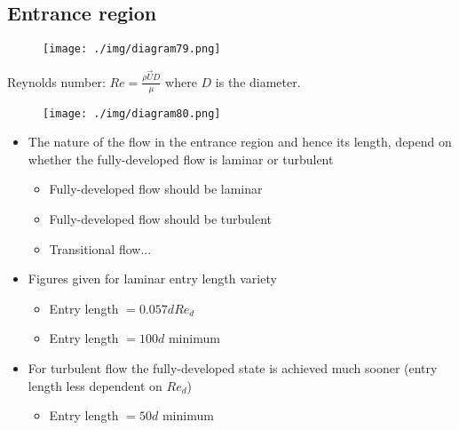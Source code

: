 \subsection{Entrance region}
\begin{figure}[H]
  \centering
  \texttt{[image: ./img/diagram79.png]}
  \caption{}
\end{figure}
Reynolds number: $Re = \frac{\rho \vec{U} D}{\mu}$ where $D$ is the diameter.
\begin{figure}[H]
  \centering
  \texttt{[image: ./img/diagram80.png]}
  \caption{}
\end{figure}
\begin{itemize}
  \item The nature of the flow in the entrance region and hence its length, depend on whether the fully-developed flow is laminar or turbulent
        \begin{itemize}
          \item {} Fully-developed flow should be laminar
          \item {} Fully-developed flow should be turbulent
          \item {} Transitional flow...
        \end{itemize}
  \item Figures given for laminar entry length variety
        \begin{itemize}
          \item {} Entry length $=0.057 d Re_d$
          \item {} Entry length $=100d$ minimum
        \end{itemize}
  \item For turbulent flow the fully-developed state is achieved much sooner (entry length less dependent on $Re_d$)
        \begin{itemize}
          \item {} Entry length $=50d$ minimum
        \end{itemize}
\end{itemize}
